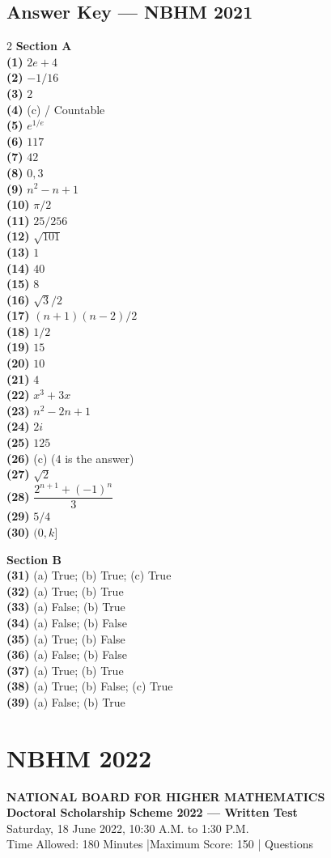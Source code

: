 \documentclass[11pt,a4paper]{article}
\newcommand{\examheader}[4]{%
  \clearpage
  \section{#1}
  \begin{center}
    {\large\bfseries NATIONAL BOARD FOR HIGHER MATHEMATICS}\\[3pt]
    {\bfseries #2}\\[2pt]
    {#3}\\[2pt]
    {\small #4}
  \end{center}
  \vspace{4pt}
}
\newcommand{\examsec}[1]{%
  \subsection*{#1}
  \vspace{-2pt}
}
\begin{document}
\examsec{Answer Key --- NBHM 2021}
\begin{multicols}{2}
\textbf{Section A}\\
\textbf{(1)} $2e + 4$\\
\textbf{(2)} $-1/16$\\
\textbf{(3)} $2$\\
\textbf{(4)} (c) / Countable\\
\textbf{(5)} $e^{1/e}$\\
\textbf{(6)} $117$\\
\textbf{(7)} $42$\\
\textbf{(8)} $0, 3$\\
\textbf{(9)} $n^2 - n + 1$\\
\textbf{(10)} $\pi/2$\\
\textbf{(11)} $25/256$\\
\textbf{(12)} $\sqrt{101}$\\
\textbf{(13)} $1$\\
\textbf{(14)} $40$\\
\textbf{(15)} $8$\\
\textbf{(16)} $\sqrt{3}/2$\\
\textbf{(17)} $(n + 1)(n - 2)/2$\\
\textbf{(18)} $1/2$\\
\textbf{(19)} $15$\\
\textbf{(20)} $10$\\
\textbf{(21)} $4$\\
\textbf{(22)} $x^3 + 3x$\\
\textbf{(23)} $n^2 - 2n + 1$\\
\textbf{(24)} $2i$\\
\textbf{(25)} $125$\\
\textbf{(26)} (c) ($4$ is the answer)\\
\textbf{(27)} $\sqrt{2}$\\
\textbf{(28)} $\dfrac{2^{n+1} + (-1)^n}{3}$\\
\textbf{(29)} $5/4$\\
\textbf{(30)} $(0, k]$

\medskip
\textbf{Section B}\\
\textbf{(31)} (a) True; (b) True; (c) True\\
\textbf{(32)} (a) True; (b) True\\
\textbf{(33)} (a) False; (b) True\\
\textbf{(34)} (a) False; (b) False\\
\textbf{(35)} (a) True; (b) False\\
\textbf{(36)} (a) False; (b) False\\
\textbf{(37)} (a) True; (b) True\\
\textbf{(38)} (a) True; (b) False; (c) True\\
\textbf{(39)} (a) False; (b) True
\end{multicols}
\examheader{NBHM 2022}{Doctoral Scholarship Scheme 2022 --- Written Test}{Saturday, 18 June 2022, 10:30 A.M. to 1:30 P.M.}{Time Allowed: 180 Minutes \quad|\quad Maximum Score: 150 \quad|\quad 34 Questions}
\end{document}
